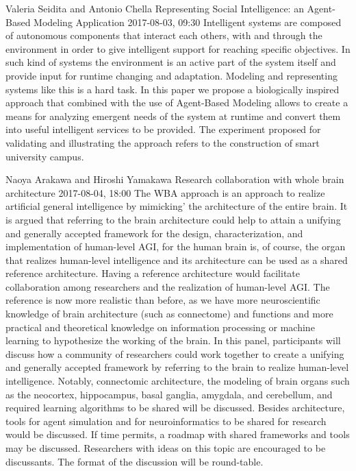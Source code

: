 \documentclass[10pt,fleqn,openany]{book} %
\begin{document}
\begin{enumerate}
		
		\paperabstract
		{Valeria Seidita and Antonio Chella}
		{Representing Social Intelligence: an Agent-Based Modeling Application}
		{2017-08-03, 09:30}
		{Intelligent systems are composed of autonomous components that interact each others, with and through the environment in order to give intelligent support for reaching specific objectives. In such kind of systems the environment is an active part of the system itself and provide input for runtime changing and adaptation. Modeling and representing systems like this is a hard task. In this paper we propose a biologically inspired approach that combined with the use of Agent-Based Modeling allows to create a means for analyzing emergent needs of the system at runtime and convert them into useful intelligent services to be provided. The experiment proposed for validating and illustrating the approach refers to the construction of smart university campus.}
		
		
		\paperabstract
		{Naoya Arakawa and Hiroshi Yamakawa}
		{Research collaboration with whole brain architecture}
		{2017-08-04, 18:00}
		{The WBA approach is an approach to realize artificial general intelligence  by mimicking' the architecture of the entire brain. It is argued that referring to the brain architecture could help to attain  a unifying and generally accepted framework for the design, characterization,  and implementation of human-level AGI, for the human brain is, of course,  the organ that realizes human-level intelligence and its architecture can be  used as a shared reference architecture.  Having a reference architecture  would facilitate collaboration among researchers and the realization of  human-level AGI. The reference is now more realistic than before, as we have more neuroscientific  knowledge of brain architecture (such as connectome) and functions and more  practical and theoretical knowledge on information processing or machine  learning to hypothesize the working of the brain. In this panel, participants will discuss how a community of researchers could  work together to create a unifying and generally accepted framework by referring  to the brain to realize human-level intelligence.  Notably, connectomic  architecture, the modeling of brain organs such as the neocortex, hippocampus,  basal ganglia, amygdala, and cerebellum, and required learning algorithms to be  shared will be discussed.  Besides architecture, tools for agent simulation and  for neuroinformatics to be shared for research would be discussed.  If time  permits, a roadmap with shared frameworks and tools may be discussed. Researchers with ideas on this topic are encouraged to be discussants. The format of the discussion will be round-table.}
		

\end{enumerate}
\end{document}
